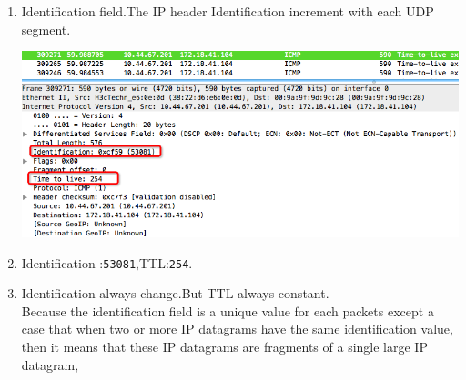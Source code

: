 \documentclass[a4paper]{article}
\begin{document}
{\begin{enumerate}
\begin{itemize}
		\end{itemize}
	   Must constant
		\begin{itemize}
			\item Version (since we are using IPv4 for all packets)
			 \item header length (since these are 20 bytes)
			 \item source IP (since we are sending from the same source)
			 \item destination IP (since we are sending to the same dest)
			 \item Differentiated Services (since all packets are UDP they use the same Type of Service class)
			 \item Upper Layer Protocol (since these are UDP packets),some point red rect in figure 2.
		   \end{itemize}
	 Must change
		\begin{itemize}
			\item Identification(IP packets must have different id)
			\item Time to live (traceroute increments each subsequent packet)
			\item Header checksum (since header changes, so must checksum)
		\end{itemize}
	\item Identification field.The IP header Identification increment with each UDP segment.
	\begin{center} \includegraphics[scale=0.5]{Illustrations/3.png} \end{center}
	\item Identification :\verb|53081|,TTL:\verb|254|.
	\item Identification always change.But TTL always constant.\\Because the identification field is a unique value for each packets except a case that when two or more IP datagrams have the same identification value, then it means that these IP datagrams are fragments of a single large IP datagram,

\end{enumerate}}
\end{document}
